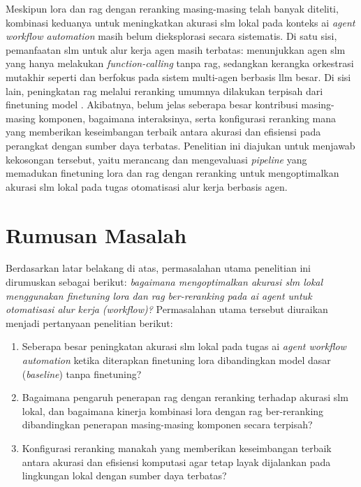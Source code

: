 Meskipun \gls{lora} dan \gls{rag} dengan \gls{reranking} masing-masing telah banyak diteliti, kombinasi keduanya untuk meningkatkan akurasi \gls{slm} lokal pada konteks \gls{ai} \textit{agent workflow automation} masih belum dieksplorasi secara sistematis. Di satu sisi, pemanfaatan \gls{slm} untuk alur kerja agen masih terbatas: \citet{erdogan2024tinyagent} menunjukkan agen \gls{slm} yang hanya melakukan \textit{function-calling} tanpa \gls{rag}, sedangkan kerangka orkestrasi mutakhir seperti \citet{niu2025flow} dan \citet{han2026legomem} berfokus pada sistem multi-agen berbasis \gls{llm} besar. Di sisi lain, peningkatan \gls{rag} melalui \gls{reranking} umumnya dilakukan terpisah dari \gls{finetuning} model \citep{yu2024rankrag, saha2024quimrag}. Akibatnya, belum jelas seberapa besar kontribusi masing-masing komponen, bagaimana interaksinya, serta konfigurasi \gls{reranking} mana yang memberikan keseimbangan terbaik antara akurasi dan efisiensi pada perangkat dengan sumber daya terbatas. Penelitian ini diajukan untuk menjawab kekosongan tersebut, yaitu merancang dan mengevaluasi \textit{pipeline} yang memadukan \gls{finetuning} \gls{lora} dan \gls{rag} dengan \gls{reranking} untuk mengoptimalkan akurasi \gls{slm} lokal pada tugas otomatisasi alur kerja berbasis agen.


\section{Rumusan Masalah}
Berdasarkan latar belakang di atas, permasalahan utama penelitian ini dirumuskan sebagai berikut: \textit{bagaimana mengoptimalkan akurasi \gls{slm} lokal menggunakan \gls{finetuning} \gls{lora} dan \gls{rag} ber-\gls{reranking} pada \gls{ai} \textit{agent} untuk otomatisasi alur kerja (\gls{workflow})?} Permasalahan utama tersebut diuraikan menjadi pertanyaan penelitian berikut:
\begin{enumerate}
    \item Seberapa besar peningkatan akurasi \gls{slm} lokal pada tugas \gls{ai} \textit{agent workflow automation} ketika diterapkan \gls{finetuning} \gls{lora} dibandingkan model dasar (\textit{baseline}) tanpa \gls{finetuning}?
    \item Bagaimana pengaruh penerapan \gls{rag} dengan \gls{reranking} terhadap akurasi \gls{slm} lokal, dan bagaimana kinerja kombinasi \gls{lora} dengan \gls{rag} ber-\gls{reranking} dibandingkan penerapan masing-masing komponen secara terpisah?
    \item Konfigurasi \gls{reranking} manakah yang memberikan keseimbangan terbaik antara akurasi dan efisiensi komputasi agar tetap layak dijalankan pada lingkungan lokal dengan sumber daya terbatas?
\end{enumerate}

